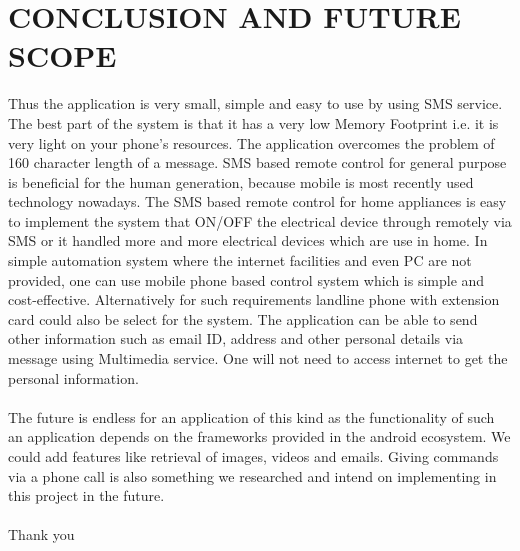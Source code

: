 

\chapter{CONCLUSION AND FUTURE SCOPE}

\hspace{0.9cm} Thus the application is very small, simple and easy to
use by using SMS service. The best part of the system
is that it has a very low Memory Footprint i.e. it is
very light on your phone's resources. The application
overcomes the problem of 160 character length of a
message. SMS based remote control for general
purpose is beneficial for the human generation,
because mobile is most recently used technology
nowadays. The SMS based remote control for home appliances is easy to implement the system
that ON/OFF the electrical device through remotely
via SMS or it handled more and more electrical
devices which are use in home. In simple
automation system where the internet facilities and
even PC are not provided, one can use mobile
phone based control system which is simple
and cost-effective. Alternatively for such
requirements landline phone with extension card
could also be select for the system.
The application can be able to send other information
such as email ID, address and other personal details
via message using Multimedia service. One will not
need to access internet to get the personal information. 
\\ \\ 
\hspace{0.9 cm} The future is endless for an application of this kind as the functionality of such an application depends on the frameworks provided in the android ecosystem. We could add features like retrieval of images, videos and emails. Giving commands via a phone call is also something we researched and intend on implementing in this project in the future. \\ \\ Thank you

